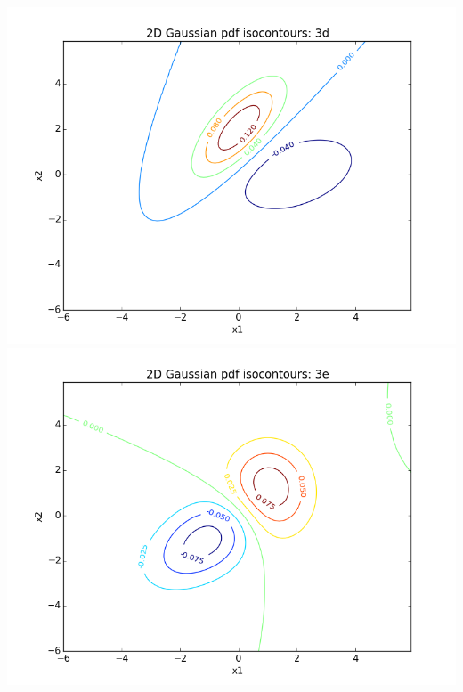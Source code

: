 \documentclass[11pt]{article}
\begin{document}
\includegraphics[scale=0.45]{images/p3d}
\includegraphics[scale=0.45]{images/p3e}


\newpage
\end{document}
